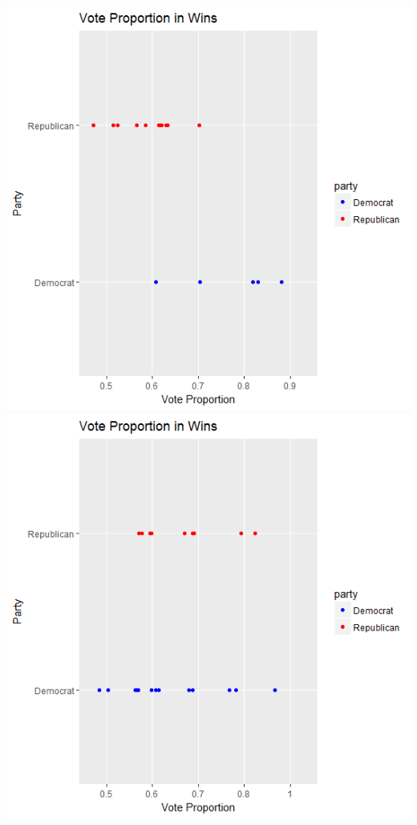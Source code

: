 \documentclass[10pt]{article}
\theoremstyle{definition}
\theoremstyle{remark}
\begin{document}
\begin{enumerate}
\begin{enumerate}
        \includegraphics[scale=0.5]{PA2012} \\
        \includegraphics[scale=0.5]{IL1984}

\end{enumerate}
\end{enumerate}
\end{document}
